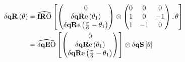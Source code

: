 \begin{align*}
\dqR[\theta] &= \fROm \left[  
\begin{pmatrix}
 0                                     \\
 \dqRe[ \thetaA ]              \\
 \dqRe[ \Pii{6} -\thetaA]   \\
\end{pmatrix} \otimes
\begin{pmatrix}
 0  &    0  &   0  \\
 1  &    0  & -1  \\
 1  & - 1  &   0  \\
\end{pmatrix}
  ,\theta \right] \\
  &= \dqEO \left[ 
  \begin{pmatrix}
   0                                     \\
   \dqRe[ \thetaA ]              \\
   \dqRe[ \Pii{6} -\thetaA]   \\
  \end{pmatrix} 
  \right]
  \otimes
  \dqs \left[ \theta \right] 
\end{align*}

